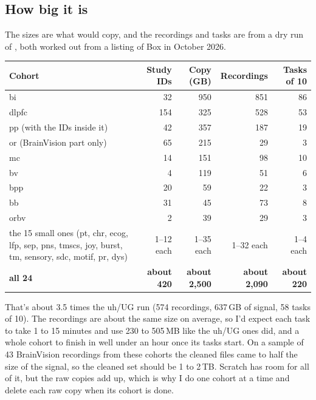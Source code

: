\subsection{How big it is}
The sizes are what  would copy, and the recordings and tasks are from a dry run of , both worked out from a listing of Box in October 2026.

\begin{tabularx}{\textwidth}{@{}Y r r r r@{}}
\toprule
\textbf{Cohort} & \textbf{Study IDs} & \textbf{Copy (GB)} & \textbf{Recordings} & \textbf{Tasks of 10} \\
\midrule
bi & 32 & 950 & 851 & 86 \\
dlpfc & 154 & 325 & 528 & 53 \\
pp (with the IDs inside it) & 42 & 357 & 187 & 19 \\
or (BrainVision part only) & 65 & 215 & 29 & 3 \\
mc & 14 & 151 & 98 & 10 \\
bv & 4 & 119 & 51 & 6 \\
bpp & 20 & 59 & 22 & 3 \\
bb & 31 & 45 & 73 & 8 \\
orbv & 2 & 39 & 29 & 3 \\
the 15 small ones (pt, chr, ecog, lfp, sep, pns, tmscs, joy, burst, tm, sensory, sdc, motif, pr, dys) & 1--12 each & 1--35 each & 1--32 each & 1--4 each \\
\midrule
\textbf{all 24} & \textbf{about 420} & \textbf{about 2,500} & \textbf{about 2,090} & \textbf{about 220} \\
\bottomrule
\end{tabularx}

\medskip
That's about 3.5 times the uh/UG run (574 recordings, 637\,GB of signal, 58 tasks of 10). The recordings are about the same size on average, so I'd expect each task to take 1 to 15 minutes and use 230 to 505\,MB like the uh/UG ones did, and a whole cohort to finish in well under an hour once its tasks start. On a sample of 43 BrainVision recordings from these cohorts the cleaned files came to half the size of the signal, so the cleaned set should be 1 to 2\,TB. Scratch has room for all of it, but the raw copies add up, which is why I do one cohort at a time and delete each raw copy when its cohort is done.

